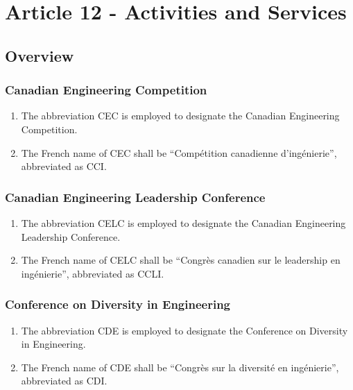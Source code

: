 \section{Article 12 - Activities and Services}
\label{article-12-activities-and-services}

\subsection{Overview}
\label{overview}

\subsubsection{Canadian Engineering Competition}
\label{canadian-engineering-competition}
\begin{enumerate}

 \item The abbreviation CEC is employed to designate the Canadian Engineering Competition.
 \item The French name of CEC shall be “Compétition canadienne d’ingénierie”, abbreviated as CCI.
\end{enumerate}

\subsubsection{Canadian Engineering Leadership Conference}
\label{canadian-engineering-leadership-conference}
\begin{enumerate}

 \item The abbreviation CELC is employed to designate the Canadian Engineering Leadership Conference.
 \item The French name of CELC shall be “Congrès canadien sur le leadership en ingénierie”, abbreviated as CCLI.
\end{enumerate}

\subsubsection{Conference on Diversity in Engineering}
\label{conference-on-diversity-in-engineering}
\begin{enumerate}

 \item The abbreviation CDE is employed to designate the Conference on Diversity in Engineering.
 \item The French name of CDE shall be “Congrès sur la diversité en ingénierie”, abbreviated as CDI.
\end{enumerate}

